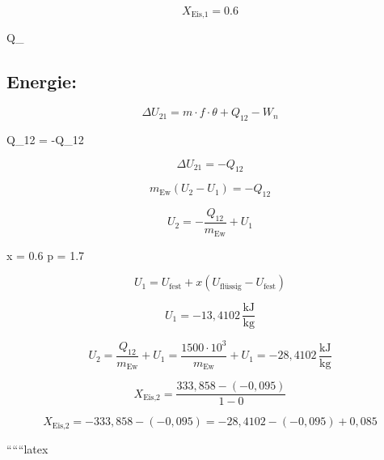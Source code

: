 \[
X_{\text{Eis,1}} = 0.6
\]

 \quad Q_{} \quad {}  \,  \quad {}

\subsection*{Energie:}

\[
\Delta U_{21} = m \cdot f \cdot \theta + Q_{12} - W_{n}
\]

 \quad Q_{12} = -Q_{12}

\[
\Delta U_{21} = -Q_{12}
\]

\[
m_{\text{Ew}} (U_2 - U_1) = -Q_{12}
\]

\[
U_2 = -\frac{Q_{12}}{m_{\text{Ew}}} + U_1
\]

 \quad x = 0.6 \quad p = 1.7 \, 

\[
U_1 = U_{\text{fest}} + x (U_{\text{flüssig}} - U_{\text{fest}})
\]

\[
U_1 = -13,4102 \, \frac{\text{kJ}}{\text{kg}}
\]

\[
U_2 = \frac{Q_{12}}{m_{\text{Ew}}} + U_1 = \frac{1500 \cdot 10^3}{m_{\text{Ew}}} + U_1 = -28,4102 \, \frac{\text{kJ}}{\text{kg}}
\]


\[
X_{\text{Eis,2}} = \frac{333,858 - (-0,095)}{1 - 0}
\]

\[
X_{\text{Eis,2}} = -333,858 - (-0,095) = -28,4102 - (-0,095) + 0,085
\]

``````latex


